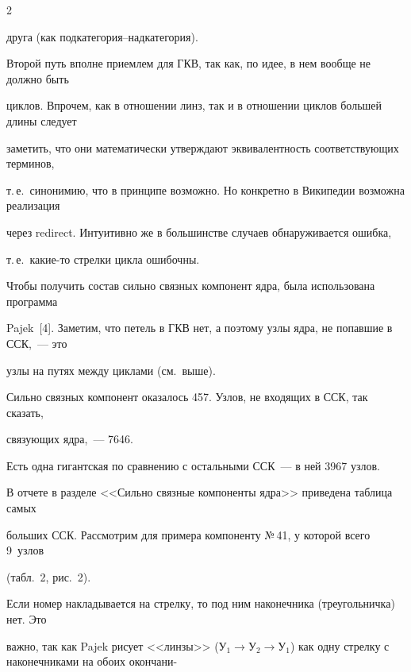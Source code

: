 \begin{multicols}{2}
\begin{enumerate}[(1)]
друга (как под\-ка\-те\-го\-рия--надкатегория). 

   \end{enumerate}

   

   Второй путь вполне приемлем для ГКВ, так как, по идее, в нем вообще не должно быть 

циклов. Впрочем, как в отношении линз, так и в отношении циклов большей длины следует 

заметить, что они математически утверждают эквивалентность соответствующих терминов, 

т.\,е.\ синонимию, что в принципе возможно. Но конкретно в Википедии возможна реализация

через {\sf redirect}. Интуитивно же в большинстве случаев обнаруживается ошибка, 

т.\,е.\ ка\-кие-то стрелки цикла ошибочны.

   

   Чтобы получить состав сильно связных компонент ядра, была использована программа 

Pajek~[4]. Заметим, что петель в ГКВ нет, а поэтому узлы ядра, не попавшие в ССК,~--- это 

узлы на путях между циклами (см.\ выше).

   

   Сильно связных компонент оказалось 457. Узлов, не входящих в ССК, так сказать, 

   связующих ядра,~--- 7646. 

Есть одна гигантская по сравнению с остальными ССК~--- в ней 3967 узлов.

   

   В отчете в разделе <<Сильно связные компоненты ядра>> приведена таблица самых 

больших ССК. Рассмотрим для примера компоненту №\,41, у которой всего 9~узлов 

(табл.~2, рис.~2).



   

   Если номер накладывается на стрелку, то под ним наконечника (треугольничка) нет. Это 

важно, так как Pajek рисует <<линзы>> ($\mathrm{У}_1\rightarrow \mathrm{У}_2\rightarrow 

\mathrm{У}_1$) как одну стрелку с наконечниками на обоих окончани-\linebreak\vspace*{-12pt}




\end{multicols}
